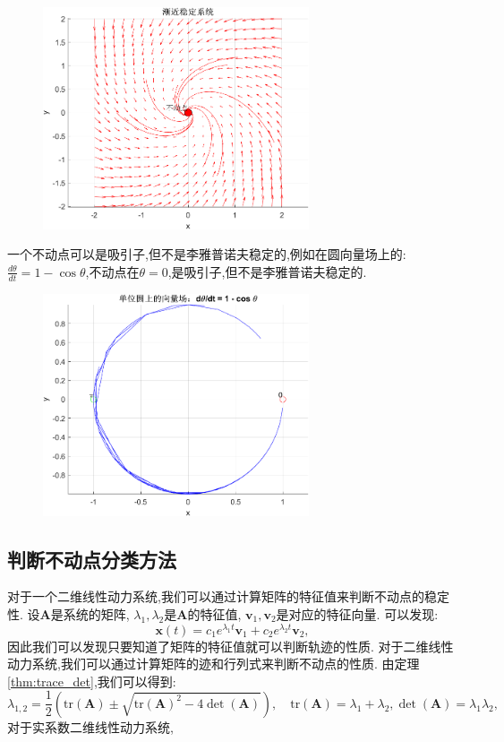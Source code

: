 \begin{figure}[H]
    \centering
    \includegraphics[width=0.7\textwidth]{Img/fix3.png}
    \label{fig:asymptotic_stable}
\end{figure}
一个不动点可以是吸引子,但不是李雅普诺夫稳定的,例如在圆向量场上的:$\frac{d\theta}{dt}=1-\cos\theta$,不动点在$\theta=0$,是吸引子,但不是李雅普诺夫稳定的. 
\begin{figure}[H]
    \centering
    \includegraphics[width=0.7\textwidth]{Img/fix1.png}
    \label{fig:attractor}
\end{figure}
\subsection*{判断不动点分类方法}

对于一个二维线性动力系统,我们可以通过计算矩阵的特征值来判断不动点的稳定性. 设$\mathbf{A}$是系统的矩阵, $\lambda_1,\lambda_2$是$\mathbf{A}$的特征值, $\mathbf{v}_1,\mathbf{v}_2$是对应的特征向量. 可以发现:
\begin{equation}
    \mathbf{x}(t)=c_1e^{\lambda_1t}\mathbf{v}_1+c_2e^{\lambda_2t}\mathbf{v}_2,
\end{equation}
因此我们可以发现只要知道了矩阵的特征值就可以判断轨迹的性质. 对于二维线性动力系统,我们可以通过计算矩阵的迹和行列式来判断不动点的性质. 由定理\ref{thm:trace_det},我们可以得到:
\begin{equation}
    \lambda_{1,2}=\frac{1}{2}\left(\text{tr}(\mathbf{A})\pm \sqrt{\text{tr}(\mathbf{A})^2-4\det(\mathbf{A})}\right),\quad \text{tr}(\mathbf{A})=\lambda_1+\lambda_2,\det(\mathbf{A})=\lambda_1\lambda_2,
\end{equation}
对于实系数二维线性动力系统,

